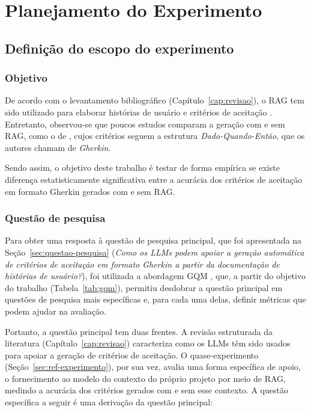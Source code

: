 \chapter[Planejamento do Experimento]{Planejamento do Experimento}
\label{cap:planejamento}

\section{Definição do escopo do experimento}
\label{sec:escopo}

\subsection{Objetivo}

De acordo com o levantamento bibliográfico (Capítulo~\ref{cap:revisao}), o RAG tem sido utilizado para elaborar histórias de usuário e critérios de aceitação \cite{rawson2025, rawson2025framework, rotar2025}. Entretanto, observou-se que poucos estudos comparam a geração com e sem RAG, como o de , cujos critérios seguem a estrutura \textit{Dado-Quando-Então}, que os autores chamam de \textit{Gherkin}.



Sendo assim, o objetivo deste trabalho é testar de forma empírica se existe diferença estatisticamente significativa entre a acurácia dos critérios de aceitação em formato Gherkin gerados com e sem RAG.

\subsection{Questão de pesquisa}
\label{sec:quest-de-pesq}
Para obter uma resposta à questão de pesquisa principal, que foi apresentada na Seção~\ref{sec:questao-pesquisa} (\textit{Como os LLMs podem apoiar a geração automática de critérios de aceitação em formato Gherkin a partir da documentação de histórias de usuário?}), foi utilizada a abordagem GQM \cite{basili1994}, que, a partir do objetivo do trabalho (Tabela~\ref{tab:gqm}), permitiu desdobrar a questão principal em questões de pesquisa mais específicas e, para cada uma delas, definir métricas que podem ajudar na avaliação.

Portanto, a questão principal tem duas frentes. A revisão estruturada da literatura (Capítulo~\ref{cap:revisao}) caracteriza como os LLMs têm sido usados para apoiar a geração de critérios de aceitação. O quase-experimento (Seção~\ref{sec:ref-experimento}), por sua vez, avalia uma forma específica de apoio, o fornecimento ao modelo do contexto do próprio projeto por meio de RAG, medindo a acurácia dos critérios gerados com e sem esse contexto. A questão específica a seguir é uma derivação da questão principal:

